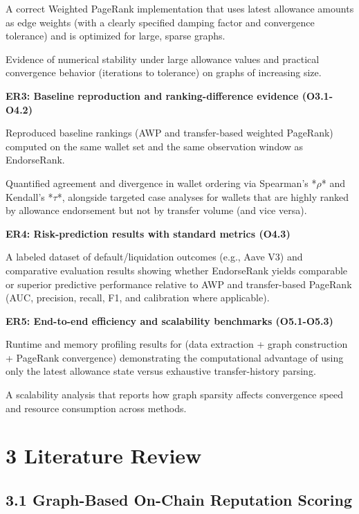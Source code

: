 \documentclass[12pt]{article}
\newcommand{\proposalResultHeading}[1]{%
  \par\addvspace{0.45\baselineskip}%
  \noindent\textbf{#1}\par\nobreak\addvspace{0.06\baselineskip}%
}
\begin{document}
A correct Weighted PageRank implementation that uses latest allowance amounts as edge weights (with a clearly specified damping factor and convergence tolerance) and is optimized for large, sparse graphs.


Evidence of numerical stability under large allowance values and practical convergence behavior (iterations to tolerance) on graphs of increasing size.


\proposalResultHeading{ER3: Baseline reproduction and ranking-difference evidence (O3.1-O4.2)}

Reproduced baseline rankings (AWP and transfer-based weighted PageRank) computed on the same wallet set and the same observation window as EndorseRank.


Quantified agreement and divergence in wallet ordering via Spearman's *\(\rho\)* and Kendall's *\(\tau\)*, alongside targeted case analyses for wallets that are highly ranked by allowance endorsement but not by transfer volume (and vice versa).


\proposalResultHeading{ER4: Risk-prediction results with standard metrics (O4.3)}

A labeled dataset of default/liquidation outcomes (e.g., Aave V3) and comparative evaluation results showing whether EndorseRank yields comparable or superior predictive performance relative to AWP and transfer-based PageRank (AUC, precision, recall, F1, and calibration where applicable).


\proposalResultHeading{ER5: End-to-end efficiency and scalability benchmarks (O5.1-O5.3)}

Runtime and memory profiling results for (data extraction + graph construction + PageRank convergence) demonstrating the computational advantage of using only the latest allowance state versus exhaustive transfer-history parsing.


A scalability analysis that reports how graph sparsity affects convergence speed and resource consumption across methods.


\clearpage
{}
\section*{3 \textbf{Literature Review}}
\label{sec:literature-review}

\subsection*{3.1 Graph-Based On-Chain Reputation Scoring}
\label{sec:graph-based-on-chain-reputation-scoring}
\end{document}
